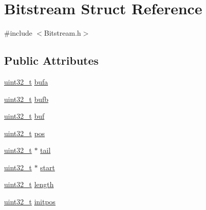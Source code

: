\hypertarget{struct_bitstream}{
\section{Bitstream Struct Reference}
\label{struct_bitstream}
}


{\ttfamily \#include $<$Bitstream.h$>$}

\subsection*{Public Attributes}
\begin{DoxyCompactItemize}
\item 
\hyperlink{_types_8h_a04909d1366bb244ff2482beb51635f37}{uint32\_\-t} \hyperlink{struct_bitstream_a2b3b7e703efb5f16a9b122862f6342ff}{bufa}
\item 
\hyperlink{_types_8h_a04909d1366bb244ff2482beb51635f37}{uint32\_\-t} \hyperlink{struct_bitstream_af88938159f6b589af03d736e9fe8119e}{bufb}
\item 
\hyperlink{_types_8h_a04909d1366bb244ff2482beb51635f37}{uint32\_\-t} \hyperlink{struct_bitstream_aa6e7d5fa7c3bcfaac4cda5c4b07f8aa1}{buf}
\item 
\hyperlink{_types_8h_a04909d1366bb244ff2482beb51635f37}{uint32\_\-t} \hyperlink{struct_bitstream_ac7479c4c4e57d10bbfdd90baf6e731a4}{pos}
\item 
\hyperlink{_types_8h_a04909d1366bb244ff2482beb51635f37}{uint32\_\-t} $\ast$ \hyperlink{struct_bitstream_addd740548c260796cf01e55597f749c6}{tail}
\item 
\hyperlink{_types_8h_a04909d1366bb244ff2482beb51635f37}{uint32\_\-t} $\ast$ \hyperlink{struct_bitstream_a4c2cb09a4fee7ed90d05f8b40914911e}{start}
\item 
\hyperlink{_types_8h_a04909d1366bb244ff2482beb51635f37}{uint32\_\-t} \hyperlink{struct_bitstream_a56ea589bea2ad26a4512ff556b055fd8}{length}
\item 
\hyperlink{_types_8h_a04909d1366bb244ff2482beb51635f37}{uint32\_\-t} \hyperlink{struct_bitstream_a3234ef24b4ec8a9d06731d4f2db67418}{initpos}
\end{DoxyCompactItemize}


